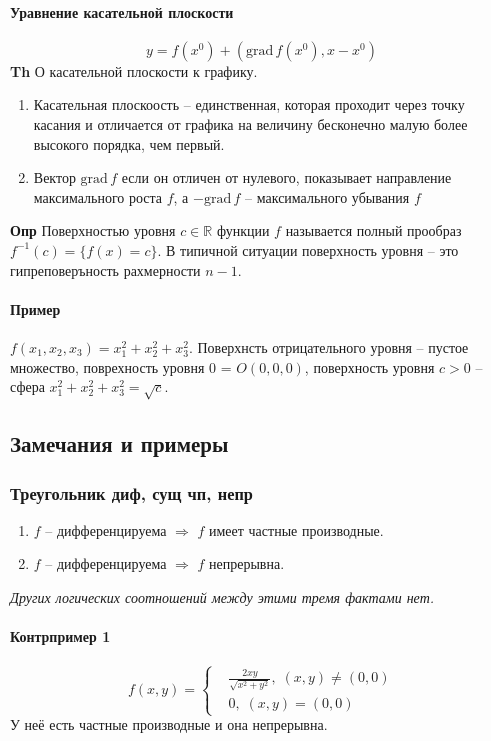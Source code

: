 \documentclass{article}
\newcommand{\R}{\mathbb{R}}
\newcommand{\bb}{\textbf}
\newcommand{\ii}{\textit}
\newcommand{\x}{\text}
\begin{document}
\paragraph*{Уравнение касательной плоскости}
$$ y = f(x^0) + (\x{grad} \, f(x^0), x-x^0) $$
\bb{Th} О касательной плоскости к графику.
\begin{enumerate}
    \item Касательная плоскоость -- единственная, которая проходит через точку касания и отличается от графика на величину бесконечно малую более высокого порядка, чем первый.
    \item Вектор $\x{grad}\, f$ если он отличен от нулевого, показывает направление максимального роста $f$, а $-\x{grad} \, f$ -- максимального убывания $f$
\end{enumerate}
\bb{Опр} Поверхностью уровня $c \in \R$ функции $f$ называется полный прообраз $f^{-1}(c) = \{ f(x) = c \}$. В типичной ситуации поверхность уровня -- это гипреповеръность рахмерности $n-1$.
\paragraph*{Пример} $f(x_1, x_2, x_3) = x_1^2 + x_2^2 + x_3^2$. Поверхнсть отрицательного уровня -- пустое множество, поврехность уровня 0 = $O(0,0,0)$, поверхность уровня $c>0$ -- сфера $x_1^2 + x_2^2+ x_3^2 = \sqrt{c}$.

\newpage
\subsection{Замечания и примеры}
\subsubsection{Треугольник диф, сущ чп, непр}
\begin{enumerate}
    \item $f$ -- дифференцируема $\Rightarrow$ $f$ имеет частные производные.
    \item $f$ -- дифференцируема $\Rightarrow$ $f$ непрерывна.
\end{enumerate}
\ii{Других логических соотношений между этими тремя фактами нет.}
\paragraph*{Контрпример 1}
\begin{equation*}
    f(x,y) = \left\{
    \begin{aligned}
         & \frac{2xy}{\sqrt{x^2 + y^2}}, \; (x,y) \neq (0,0) \\
         & 0, \; (x,y) = (0,0)
    \end{aligned}
    \right.
\end{equation*}
У неё есть частные производные и она непрерывна.
\end{document}
